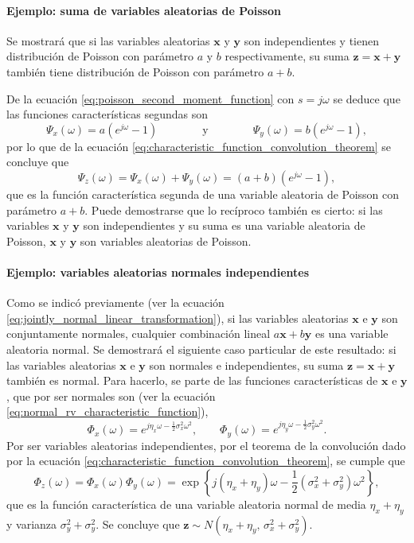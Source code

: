\documentclass[a4paper]{report}
\newcommand{\x}{\mathbf{x}}
\newcommand{\y}{\mathbf{y}}
\newcommand{\z}{\mathbf{z}}
\begin{document}
\paragraph{Ejemplo: suma de variables aleatorias de Poisson} Se mostrará que si las variables aleatorias \(\x\) y \(\y\) son independientes y tienen distribución de Poisson con parámetro \(a\) y \(b\) respectivamente, su suma \(\z=\x+\y\) también tiene distribución de Poisson con parámetro \(a+b\).

De la ecuación \ref{eq:poisson_second_moment_function} con \(s=j\omega\) se deduce que las funciones características segundas son
\[
 \Psi_x(\omega)=a(e^{j\omega}-1)
  \qquad\qquad\textrm{y}\qquad\qquad
 \Psi_y(\omega)=b(e^{j\omega}-1), 
\]
por lo que de la ecuación \ref{eq:characteristic_function_convolution_theorem} se concluye que 
\begin{equation}\label{eq:poisson_sum_characteristic}
 \Psi_z(\omega)=\Psi_x(\omega)+\Psi_y(\omega)=(a+b)(e^{j\omega}-1),
\end{equation}
que es la función característica segunda de una variable aleatoria de Poisson con parámetro \(a+b\). Puede demostrarse que lo recíproco también es cierto: si las variables \(\x\) y \(\y\) son independientes y su suma es una variable aleatoria de Poisson, \(\x\) y \(\y\) son variables aleatorias de Poisson.

\paragraph{Ejemplo: variables aleatorias normales independientes}

Como se indicó previamente (ver la ecuación \ref{eq:jointly_normal_linear_transformation}), si las variables aleatorias \(\x\) e \(\y\) son conjuntamente normales, cualquier combinación lineal \(a\x+b\y\) es una variable aleatoria normal. Se demostrará el siguiente caso particular de este resultado: si las variables aleatorias \(\x\) e \(\y\) son normales e independientes, su suma \(\z=\x+\y\) también es normal. Para hacerlo, se parte de las funciones características de \(\x\) e \(\y\), que por ser normales son (ver la ecuación \ref{eq:normal_rv_characteristic_function}),
\[
 \Phi_x(\omega)=e^{j\eta_x\omega-\frac{1}{2}\sigma_x^2\omega^2},\qquad \Phi_y(\omega)=e^{j\eta_y\omega-\frac{1}{2}\sigma_y^2\omega^2}.
\]
Por ser variables aleatorias independientes, por el teorema de la convolución dado por la ecuación \ref{eq:characteristic_function_convolution_theorem}, se cumple que
\[
 \Phi_z(\omega)=\Phi_x(\omega)\Phi_y(\omega)=\exp\left\{j(\eta_x+\eta_y)\omega-\frac{1}{2}(\sigma_x^2+\sigma_y^2)\omega^2\right\},
\]
que es la función característica de una variable aleatoria normal de media \(\eta_x+\eta_y\) y varianza \(\sigma_y^2+\sigma_y^2\). Se concluye que \(\z\sim N(\eta_x+\eta_y,\,\sigma_x^2+\sigma_y^2)\).
\end{document}
